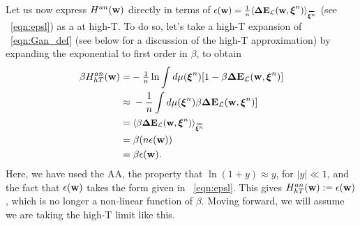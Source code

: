 {%


Let us now express $H^{an}({\mathbf{w}})$ directly in terms of $\EPSLw=\tfrac{1}{n}\langle\DETOPXI \rangle_{\AVGNDXIn}$ (see \EQN~\ref{eqn:epsl}) as a \ThermalAverage at high-T.
To do so, let's take a high-T expansion of \EQN~\ref{eqn:Gan_def} (see below for a discussion of the high-T approximation) by expanding the exponential to first order in $\beta$, to obtain
\begin{align}
\label{eqn:Gan_highT}
\beta\GANHT
=&  - \tfrac{1}{n}\ln \int d\mu(\NDXIn) [1-\beta \DETOPXI] \\ \nonumber
\approx&\;   - \frac{1}{n} \int d\mu(\NDXIn)\beta \DETOPXI] \\ \nonumber
=&\;\langle \beta\DETOPXI \rangle_{\AVGNDXIn} \\ \nonumber
=&\;\beta (n\EPSLw)\\ 
\label{eqn:Gan_highT_final}
=&\;\beta \EPSLw  .
\end{align}
Here, we have used the AA, the property that $\ln(1 + y) \approx y$, for $|y| \ll 1$, and the fact that $\epsilon({\mathbf{w}})$ takes the form given in \EQN~\ref{eqn:epsl}.
This gives $H^{an}_{hT}({\mathbf{w}}):=\epsilon({\mathbf{w}})$, which is no longer a non-linear function of $\beta$.
Moving forward, we will assume we are taking the high-T limit like this.

}
